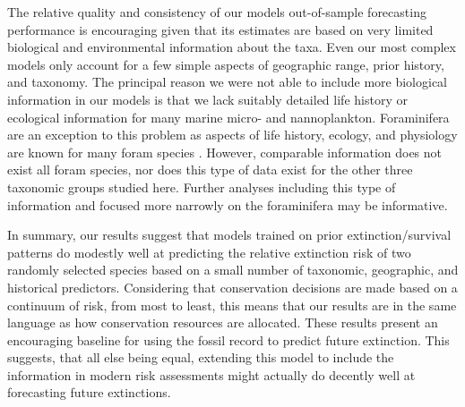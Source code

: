 \documentclass[12pt,letterpaper]{article}
\begin{document}
\begin{refsection}
The relative quality and consistency of our models out-of-sample forecasting performance is encouraging given that its estimates are based on very limited biological and environmental information about the taxa. Even our most complex models only account for a few simple aspects of geographic range, prior history, and taxonomy. The principal reason we were not able to include more biological information in our models is that we lack suitably detailed life history or ecological information for many marine micro- and nannoplankton. Foraminifera are an exception to this problem as aspects of life history, ecology, and physiology are known for many foram species \citep{Ezard2011}. However, comparable information does not exist all foram species, nor does this type of data exist for the other three taxonomic groups studied here. Further analyses including this type of information and focused more narrowly on the foraminifera may be informative. 



In summary, our results suggest that models trained on prior extinction/survival patterns do modestly well at predicting the relative extinction risk of two randomly selected species based on a small number of taxonomic, geographic, and historical predictors. Considering that conservation decisions are made based on a continuum of risk, from most to least, this means that our results are in the same language as how conservation resources are allocated. These results present an encouraging baseline for using the fossil record to predict future extinction. This suggests, that all else being equal, extending this model to include the information in modern risk assessments might actually do decently well at forecasting future extinctions.


\printbibliography
\end{refsection}
\clearpage
\end{document}
